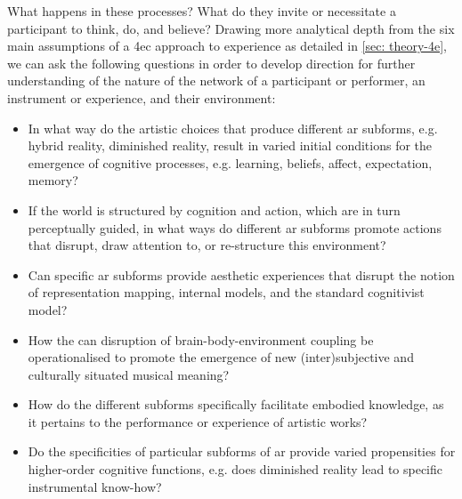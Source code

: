 What happens in these processes?  What do they invite or necessitate a participant to think, do, and believe? Drawing more analytical depth from the six main assumptions of a \gls{4ec} approach to experience as detailed in \autoref{sec: theory-4e}, we can ask the following questions in order to develop direction for further understanding of the nature of the network of a participant or performer, an instrument or experience, and their environment:
	\begin{itemize}
	    \item In what way do the artistic choices that produce different \gls{ar} subforms, e.g. hybrid reality, diminished reality, result in varied initial conditions for the emergence of cognitive processes, e.g. learning, beliefs, affect, expectation, memory?

	    \item If the world is structured by cognition and action, which are in turn perceptually guided, in what ways do different \gls{ar} subforms promote actions that disrupt, draw attention to, or re-structure this environment?

	    \item Can specific \gls{ar} subforms provide aesthetic experiences that disrupt the notion of representation mapping, internal models, and the standard cognitivist model?

	    \item How the can disruption of brain-body-environment coupling be operationalised to promote the emergence of new (inter)subjective and culturally situated musical meaning?

	    \item How do the different subforms specifically facilitate embodied knowledge, as it pertains to the performance or experience of artistic works?

	    \item Do the specificities of particular subforms of \gls{ar} provide varied propensities for higher-order cognitive functions, e.g. does diminished reality lead to specific instrumental know-how?
	\end{itemize}

